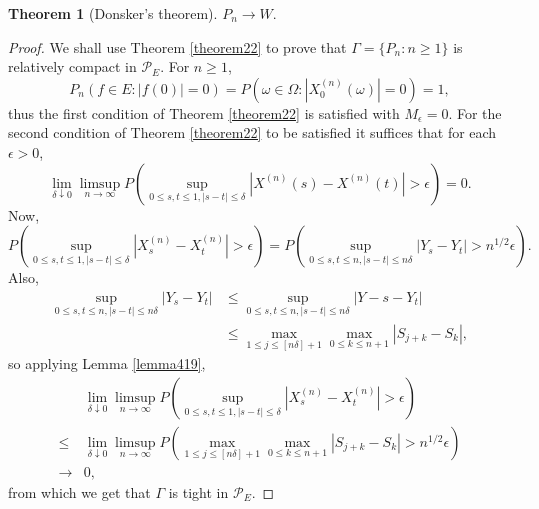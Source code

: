 \documentclass{article}
\theoremstyle{definition}
\newtheorem{theorem}{Theorem}
\theoremstyle{definition}
\begin{document}
\begin{theorem}[Donsker's theorem]
$P_n \to W$.
\end{theorem}
\begin{proof}
We shall use Theorem \ref{theorem22} to prove that $\Gamma = \{P_n : n \geq 1\}$ is relatively compact in $\mathscr{P}_E$. 
For $n \geq 1$, 
\[
P_n( f \in E: |f(0)| = 0) = P(\omega \in \Omega : |X_0^{(n)}(\omega)|=0) = 1,
\]
thus the first condition of Theorem \ref{theorem22} is satisfied with $M_\epsilon=0$.
For the second condition of Theorem \ref{theorem22} to be satisfied it suffices that for each $\epsilon>0$,
\[
\lim_{\delta \downarrow 0} \limsup_{n \to \infty} P\left( \sup_{0 \leq s,t \leq 1, |s-t| \leq \delta} |X^{(n)}(s)-X^{(n)}(t)| > \epsilon\right) = 0.
\]
Now,
\[
P\left( \sup_{0 \leq s,t \leq 1, |s-t| \leq \delta} |X^{(n)}_s-X^{(n)}_t| > \epsilon\right) = P\left(\sup_{0 \leq s,t \leq n, |s-t| \leq n\delta} |Y_s-Y_t| > n^{1/2} \epsilon\right).
\]
Also,
\begin{align*}
\sup_{0 \leq s,t \leq n, |s-t| \leq n\delta} |Y_s-Y_t|& \leq \sup_{0 \leq s,t \leq n, |s-t| \leq n\delta} |Y-s-Y_t| \\
&\leq \max_{1 \leq j \leq [n\delta]+1} \max_{0 \leq k \leq n+1} |S_{j+k}-S_k|,
\end{align*}
so 
applying Lemma \ref{lemma419},
\[
\begin{split}
&\lim_{\delta \downarrow 0} \limsup_{n \to \infty} 
P\left( \sup_{0 \leq s,t \leq 1, |s-t| \leq \delta} |X^{(n)}_s-X^{(n)}_t| > \epsilon\right) \\
\leq&\lim_{\delta \downarrow 0} \limsup_{n \to \infty} P\left( \max_{1 \leq j \leq [n\delta]+1} \max_{0 \leq k \leq n+1} |S_{j+k}-S_k| > n^{1/2} \epsilon\right)\\
\to&0,
\end{split}
\]
from which we get that $\Gamma$ is tight in $\mathscr{P}_E$. 
\end{proof}
\end{document}
